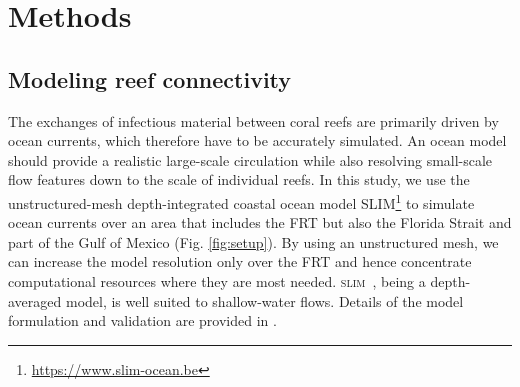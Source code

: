\documentclass[utf8]{frontiersSCNS}
\newcommand{\slim}{\textsc{slim}\ }
\begin{document}
\section{Methods}

\subsection{Modeling reef connectivity}
The exchanges of infectious material between coral reefs are primarily driven by ocean currents, which therefore have to be accurately simulated. An ocean model should provide a realistic large-scale circulation while also resolving small-scale flow features down to the scale of individual reefs. In this study, we use the unstructured-mesh depth-integrated coastal ocean model SLIM\footnote{\url{https://www.slim-ocean.be}} to simulate ocean currents over an area that includes the FRT but also the Florida Strait and part of the Gulf of Mexico (Fig. \ref{fig:setup}). By using an unstructured mesh, we can increase the model resolution only over the FRT and hence concentrate computational resources where they are most needed. \slim, being a depth-averaged model, is well suited to shallow-water flows. %
Details of the model formulation and validation are provided in \cite{frys20}. 
\end{document}

